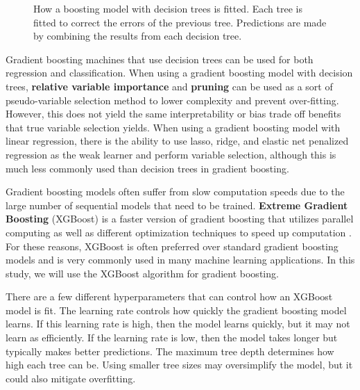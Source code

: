 \documentclass{article}
\begin{document}
\begin{figure}[t!]
	\footnotesize
	\centering
	
	\captionsetup{width = 0.8\textwidth}
	\caption{How a boosting model with decision trees is fitted. Each tree is fitted to correct the errors of the previous tree. Predictions are made by combining the results from each decision tree.}
	\label{fig:boosting}
\end{figure}

Gradient boosting machines that use decision trees can be used for both regression and classification. When using a gradient boosting model with decision trees, \textbf{relative variable importance} and \textbf{pruning} can be used as a sort of pseudo-variable selection method to lower complexity and prevent over-fitting. However, this does not yield the same interpretability or bias trade off benefits that true variable selection yields. When using a gradient boosting model with linear regression, there is the ability to use lasso, ridge, and elastic net penalized regression as the weak learner and perform variable selection, although this is much less commonly used than decision trees in gradient boosting.

Gradient boosting models often suffer from slow computation speeds due to the large number of sequential models that need to be trained. \textbf{Extreme Gradient Boosting} (XGBoost) is a faster version of gradient boosting that utilizes parallel computing as well as different optimization techniques to speed up computation \cite{chen2016xgboost}. For these reasons, XGBoost is often preferred over standard gradient boosting models and is very commonly used in many machine learning applications. In this study, we will use the XGBoost algorithm for gradient boosting.

There are a few different hyperparameters that can control how an XGBoost model is fit. The learning rate controls how quickly the gradient boosting model learns. If this learning rate is high, then the model learns quickly, but it may not learn as efficiently. If the learning rate is low, then the model takes longer but typically makes better predictions. The maximum tree depth determines how high each tree can be. Using smaller tree sizes may oversimplify the model, but it could also mitigate overfitting.
\end{document}
